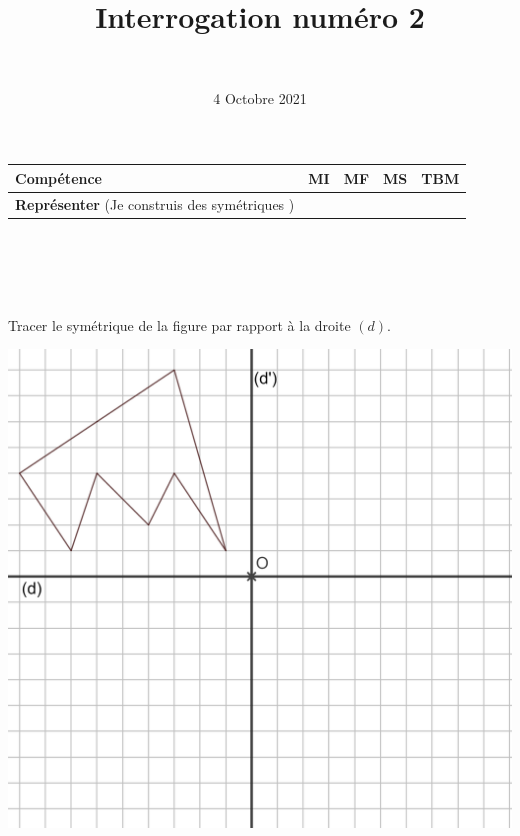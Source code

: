 \documentclass[a4paper,11pt]{exam}
\author{\ }
\date{4 Octobre 2021}
\title{Interrogation num\'ero 2}
\begin{document}
	
	\maketitle
	
	
		\begin{center}
			\begin{tabular}{|@{\ }l@{\ }|@{\ }c@{\ }|@{\ }c@{\ }|@{\ }c@{\ }|@{\ }c@{\ }|}
				\hline
				\textbf{Compétence} & \textbf{MI} & \textbf{MF} & \textbf{MS} & \textbf{TBM} \\
				\hline
				\textbf{Représenter} (Je construis des symétriques )&  \ \ & \ \ & \ \ & \ \  \\
				\hline
			\end{tabular}
		\end{center}
	
	
	\section{\ }
	
	Tracer le symétrique de la figure par rapport à la droite $(d)$.
	
	\begin{center}
		\includegraphics[scale=0.20]{img/fig1_2}
	\end{center}
	
\end{document}
